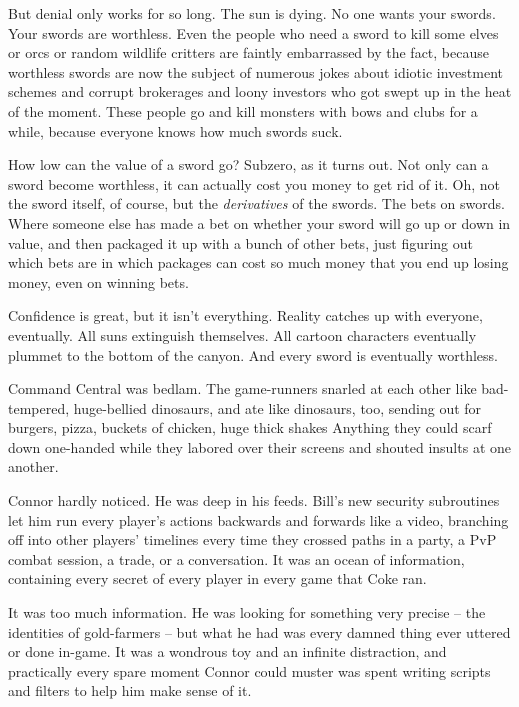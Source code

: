 But denial only works for so long. The sun is dying. No one wants
your swords. Your swords are worthless. Even the people who need a
sword to kill some elves or orcs or random wildlife critters are
faintly embarrassed by the fact, because worthless swords are now
the subject of numerous jokes about idiotic investment schemes and
corrupt brokerages and loony investors who got swept up in the heat
of the moment. These people go and kill monsters with bows and
clubs for a while, because everyone knows how much swords suck.

How low can the value of a sword go? Subzero, as it turns out. Not
only can a sword become worthless, it can actually cost you money
to get rid of it. Oh, not the sword itself, of course, but the
\emph{derivatives} of the swords. The bets on swords. Where someone
else has made a bet on whether your sword will go up or down in
value, and then packaged it up with a bunch of other bets, just
figuring out which bets are in which packages can cost so much
money that you end up losing money, even on winning bets.

Confidence is great, but it isn't everything. Reality catches up
with everyone, eventually. All suns extinguish themselves. All
cartoon characters eventually plummet to the bottom of the canyon.
And every sword is eventually worthless.

\tb

Command Central was bedlam. The game-runners snarled at each other
like bad-tempered, huge-bellied dinosaurs, and ate like dinosaurs,
too, sending out for burgers, pizza, buckets of chicken, huge thick
shakes Anything they could scarf down one-handed while they labored
over their screens and shouted insults at one another.

Connor hardly noticed. He was deep in his feeds. Bill's new
security subroutines let him run every player's actions backwards
and forwards like a video, branching off into other players'
timelines every time they crossed paths in a party, a PvP combat
session, a trade, or a conversation. It was an ocean of
information, containing every secret of every player in every game
that Coke ran.

It was too much information. He was looking for something very
precise -- the identities of gold-farmers -- but what he had was
every damned thing ever uttered or done in-game. It was a wondrous
toy and an infinite distraction, and practically every spare moment
Connor could muster was spent writing scripts and filters to help
him make sense of it.

